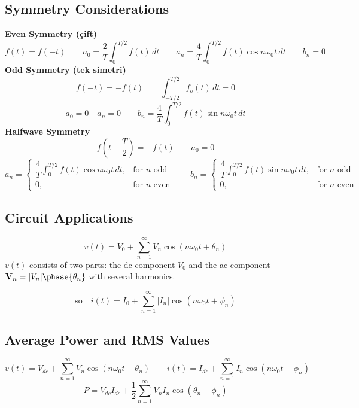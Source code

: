 \documentclass[11pt,a4paper]{article}
\begin{document}
\subsection{Symmetry Considerations}
\textbf{Even Symmetry (çift)}
\[
  f(t)=f(-t) \qquad
  a_0=\frac{2}{T}\int_0^{T/2} f(t)\,dt \qquad
  a_n=\frac{4}{T}\int_0^{T/2} f(t)\cos n\omega_0 t\,dt \qquad b_n=0
\]
\textbf{Odd Symmetry (tek simetri)}
\[
  f(-t)=-f(t) \qquad \int_{-T/2}^{T/2} f_o(t)\,dt=0
\]
\[
  a_0=0 \quad a_n=0 \qquad
  b_n=\frac{4}{T}\int_0^{T/2} f(t)\sin n\omega_0 t\,dt
\]
\textbf{Halfwave Symmetry}
\[
  f\!\left(t-\frac{T}{2}\right)=-f(t) \qquad a_0=0
\]
\[
  a_n=\begin{cases}
    \dfrac{4}{T}\displaystyle\int_0^{T/2} f(t)\cos n\omega_0 t\,dt, & \text{for } n \text{ odd}\\[2mm]
    0, & \text{for } n \text{ even}
  \end{cases}
  \qquad
  b_n=\begin{cases}
    \dfrac{4}{T}\displaystyle\int_0^{T/2} f(t)\sin n\omega_0 t\,dt, & \text{for } n \text{ odd}\\[2mm]
    0, & \text{for } n \text{ even}
  \end{cases}
\]

\subsection{Circuit Applications}
\[
  v(t)=V_0+\sum_{n=1}^{\infty}V_n\cos(n\omega_0 t+\theta_n)
\]
$v(t)$ consists of two parts: the dc component $V_0$ and the ac component $\mathbf{V}_n=|V_n|\phase{\theta_n}$ with several harmonics.

\[
  \text{so}\quad i(t)=I_0+\sum_{n=1}^{\infty}|I_n|\cos(n\omega_0 t+\psi_n)
\]

\subsection{Average Power and RMS Values}
\[
  v(t)=V_{dc}+\sum_{n=1}^{\infty}V_n\cos(n\omega_0 t-\theta_n) \qquad
  i(t)=I_{dc}+\sum_{n=1}^{\infty}I_n\cos(n\omega_0 t-\phi_n)
\]
\[
  P=V_{dc}I_{dc}+\frac{1}{2}\sum_{n=1}^{\infty}V_nI_n\cos(\theta_n-\phi_n)
\]
\end{document}
